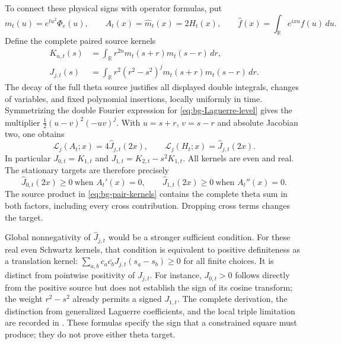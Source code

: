 \documentclass[11pt]{article}
\numberwithin{equation}{section}
\theoremstyle{definition}
\theoremstyle{remark}
\begin{document}
To connect these physical signs with operator formulas, put
\begin{equation}
 m_t(u)=e^{tu^2}\Phi_e(u),\qquad
 A_t(x)=\widehat m_t(x)=2H_t(x),\qquad
 \widehat f(x)=\int_{\mathbb R}e^{ixu}f(u)\,du.
 \label{eq:bg-full-Fourier}
\end{equation}
Define the complete paired source kernels
\begin{align}
 K_{n,t}(s)&=\int_{\mathbb R}r^{2n}m_t(s+r)m_t(s-r)\,dr,
 \nonumber\\
 J_{j,t}(s)&=\int_{\mathbb R}r^2(r^2-s^2)^j
 m_t(s+r)m_t(s-r)\,dr.
 \label{eq:bg-pair-kernels}
\end{align}
The decay of the full theta source justifies all displayed double
integrals, changes of variables, and fixed polynomial insertions,
locally uniformly in time. Symmetrizing the double Fourier expression
for \eqref{eq:bg-Laguerre-level} gives the multiplier
$\tfrac12(u-v)^2(-uv)^j$. With $u=s+r$, $v=s-r$ and absolute
Jacobian two, one obtains
\begin{equation}
 \mathscr L_j(A_t;x)=4\widehat J_{j,t}(2x),\qquad
 \mathscr L_j(H_t;x)=\widehat J_{j,t}(2x).
 \label{eq:bg-Laguerre-Fourier}
\end{equation}
In particular $J_{0,t}=K_{1,t}$ and
$J_{1,t}=K_{2,t}-s^2K_{1,t}$. All kernels are even and real.
The stationary targets are therefore precisely
\begin{equation}
 \widehat J_{0,t}(2x)\ge0\ \text{when }A_t'(x)=0,
 \qquad
 \widehat J_{1,t}(2x)\ge0\ \text{when }A_t''(x)=0.
 \label{eq:bg-pair-targets}
\end{equation}
The source product in \eqref{eq:bg-pair-kernels} contains the complete
theta sum in both factors, including every cross contribution. Dropping
cross terms changes the target.

Global nonnegativity of $\widehat J_{j,t}$ would be a stronger sufficient
condition. For these real even Schwartz kernels, that condition is
equivalent to positive definiteness as a translation kernel:
$\sum_{a,b}c_a\overline{c_b}J_{j,t}(s_a-s_b)\ge0$ for all finite
choices. It is distinct from pointwise positivity of $J_{j,t}$.
For instance, $J_{0,t}>0$ follows directly from the positive source but
does not establish the sign of its cosine transform; the weight
$r^2-s^2$ already permits a signed $J_{1,t}$. The complete derivation,
the distinction from generalized Laguerre coefficients, and the local
triple limitation are recorded in \cite{kernelnote}. These formulas
specify the sign that a constrained square must produce; they do not
prove either theta target.
\end{document}
